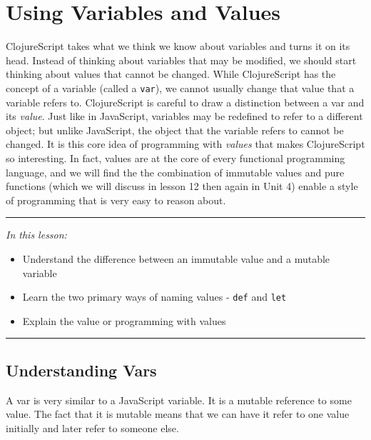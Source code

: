 \documentclass[10pt,twoside,openright]{memoir}
\begin{document}
\chapter{Using Variables and Values}

ClojureScript takes what we think we know about variables and turns it
on its head. Instead of thinking about variables that may be modified,
we should start thinking about values that cannot be changed. While
ClojureScript has the concept of a variable (called a \texttt{var}), we
cannot usually change that value that a variable refers to.
ClojureScript is careful to draw a distinction between a var and its
\emph{value}. Just like in JavaScript, variables may be redefined to
refer to a different object; but unlike JavaScript, the object that the
variable refers to cannot be changed. It is this core idea of
programming with \emph{values} that makes ClojureScript so interesting.
In fact, values are at the core of every functional programming
language, and we will find the the combination of immutable values and
pure functions (which we will discuss in lesson 12 then again in Unit 4)
enable a style of programming that is very easy to reason about.

\begin{center}\rule{0.5\linewidth}{0.5pt}\end{center}

\emph{In this lesson:}

\begin{itemize}
\tightlist
\item
  Understand the difference between an immutable value and a mutable
  variable
\item
  Learn the two primary ways of naming values - \texttt{def} and
  \texttt{let}
\item
  Explain the value or programming with values
\end{itemize}

\begin{center}\rule{0.5\linewidth}{0.5pt}\end{center}


\section{Understanding Vars}

A var is very similar to a JavaScript variable. It is a mutable
reference to some value. The fact that it is mutable means that we can
have it refer to one value initially and later refer to someone else.
\end{document}
